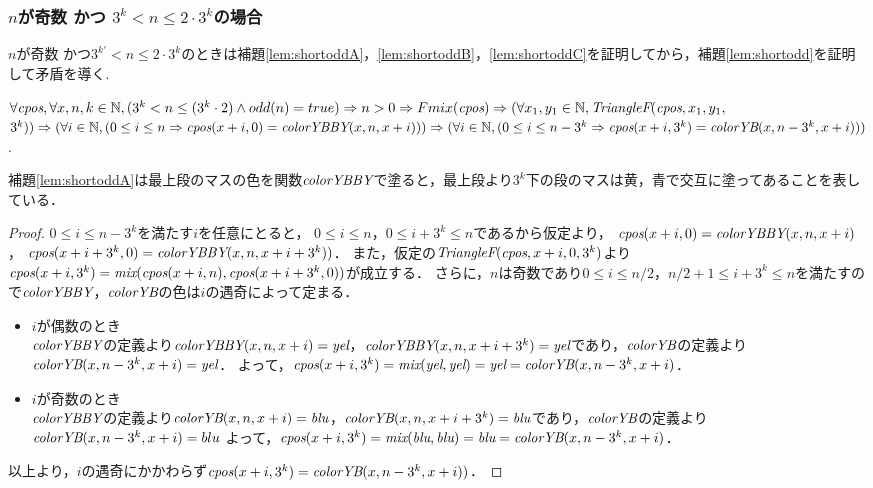 \subsubsection{$n$が奇数 かつ $3^{k} < n \leq 2 \cdot 3^{k}$の場合}
$n$が奇数 かつ$3^{k'} < n \leq 2 \cdot 3^{k}$のときは補題\ref{lem:shortoddA}，\ref{lem:shortoddB}，\ref{lem:shortoddC}を証明してから，補題\ref{lem:shortodd}を証明して矛盾を導く.
\begin{lem}[\ShortOddA] \label{lem:shortoddA}
  $\forall \textit{cpos}, \forall x, n, k \in \mathbb{N},
  (3^k < n \leq (3^k\cdot2) \land odd(n) = true) \Rightarrow
  n > 0  \Rightarrow Fmix(\textit{cpos}) \Rightarrow 
  (\forall x_1, y_1 \in \mathbb{N}, \textit{TriangleF}(\textit{cpos},x_1,y_1,$ $3^k)) \Rightarrow
  (\forall i \in \mathbb{N}, (0 \leq i \leq n \Rightarrow \textit{cpos}(x+i,0) = \textit{colorYBBY}(x,n,x+i))) \Rightarrow
  (\forall i \in \mathbb{N}, (0 \leq i \leq n - 3^k \Rightarrow \textit{cpos}(x+i,3^k) = \textit{colorYB}(x,n-3^k,x+i)))$.
\end{lem}
補題\ref{lem:shortoddA}は最上段のマスの色を関数$\textit{colorYBBY}$で塗ると，最上段より$3^k$下の段のマスは黄，青で交互に塗ってあることを表している．
\begin{proof}
  $0 \leq i \leq n-3^k$を満たす$i$を任意にとると，
  $0 \leq i \leq n$，$0 \leq i+3^k \leq n$であるから仮定より，
  $\textit{cpos}(x+i,0) = \textit{colorYBBY}(x,n,x+i)$，
  $\textit{cpos}(x+i+3^k,0) = \textit{colorYBBY}(x,n,x+i+3^k))$．
  また，仮定の$\textit{TriangleF}(\textit{cpos},x+i,0,3^k)$より
  $\textit{cpos}(x+i,3^k)=\textit{mix}(\textit{cpos}(x+i,n),\textit{cpos}(x+i+3^k,0))$が成立する．
  さらに，$n$は奇数であり$0 \leq i \leq n/2$，$n/2+1 \leq i+3^k \leq n$を満たすので$\textit{colorYBBY}$，$\textit{colorYB}$の色は$i$の遇奇によって定まる．
  \begin{itemize}
  \item
    $i$が偶数のとき \\
    $\textit{colorYBBY}$の定義より$\textit{colorYBBY}(x,n,x+i)=\textit{yel}$，$\textit{colorYBBY}(x,n,x+i+3^k)=\textit{yel}$であり，$\textit{colorYB}$の定義より$\textit{colorYB}(x,n-3^k,x+i)=\textit{yel}$．
    よって，$\textit{cpos}(x+i,3^k)=\textit{mix}(\textit{yel},\textit{yel})=\textit{yel}=\textit{colorYB}(x,n-3^k,x+i)$．
  \item
    $i$が奇数のとき \\
    $\textit{colorYBBY}$の定義より$\textit{colorYB}(x,n,x+i)=\textit{blu}$，$\textit{colorYB}(x,n,x+i+3^k)=\textit{blu}$であり，$\textit{colorYB}$の定義より$\textit{colorYB}(x,n-3^k,x+i)=blu$
    よって，$\textit{cpos}(x+i,3^k)=\textit{mix}(\textit{blu},\textit{blu})=\textit{blu}=\textit{colorYB}(x,n-3^k,x+i)$．
  \end{itemize}
  以上より，$i$の遇奇にかかわらず$\textit{cpos}(x+i,3^k) = \textit{colorYB}(x,n-3^k,x+i))$．
\end{proof}

